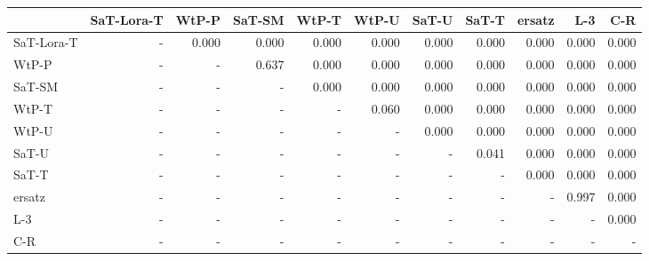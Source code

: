 \begin{tabular}{lrrrrrrrrrr}
\toprule
 & SaT-Lora-T & WtP-P & SaT-SM & WtP-T & WtP-U & SaT-U & SaT-T & ersatz & L-3 & C-R \\
\midrule
SaT-Lora-T & - & 0.000 & 0.000 & 0.000 & 0.000 & 0.000 & 0.000 & 0.000 & 0.000 & 0.000 \\
WtP-P & - & - & 0.637 & 0.000 & 0.000 & 0.000 & 0.000 & 0.000 & 0.000 & 0.000 \\
SaT-SM & - & - & - & 0.000 & 0.000 & 0.000 & 0.000 & 0.000 & 0.000 & 0.000 \\
WtP-T & - & - & - & - & 0.060 & 0.000 & 0.000 & 0.000 & 0.000 & 0.000 \\
WtP-U & - & - & - & - & - & 0.000 & 0.000 & 0.000 & 0.000 & 0.000 \\
SaT-U & - & - & - & - & - & - & 0.041 & 0.000 & 0.000 & 0.000 \\
SaT-T & - & - & - & - & - & - & - & 0.000 & 0.000 & 0.000 \\
ersatz & - & - & - & - & - & - & - & - & 0.997 & 0.000 \\
L-3 & - & - & - & - & - & - & - & - & - & 0.000 \\
C-R & - & - & - & - & - & - & - & - & - & - \\
\bottomrule
\end{tabular}

